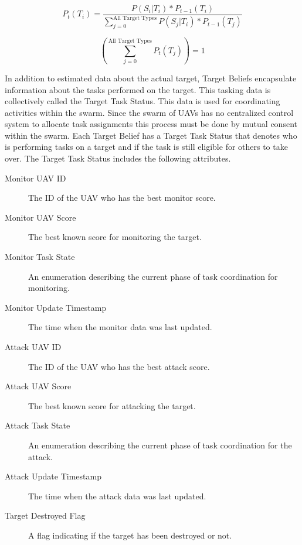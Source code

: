\begin{multicols*}{2}



\begin{equation}
\label{eq:bayesianTgt}
P_{t}(T_{i}) = \frac{P(S_{i}|T_{i})*P_{t-1}(T_{i})}{ \sum_{j=0}^{\text{All Target Types}}P(S_{j}|T_{i}) * P_{t-1}(T_{j}) }
\end{equation}

\begin{equation}
\label{eq:probsNormalize}
\left( \sum_{j=0}^{\text{All Target Types}}P_{t}(T_{j})\right)  = 1
\end{equation}



In addition to estimated data about the actual target, Target Beliefs encapsulate information about the tasks performed on the target.  This tasking data is collectively called the Target Task Status.  This data is used for coordinating activities within the swarm.  Since the swarm of UAVs has no centralized control system to allocate task assignments this process must be done by mutual consent within the swarm.  Each Target Belief has a Target Task Status that denotes who is performing tasks on a target and if the task is still eligible for others to take over.  The Target Task Status includes the following attributes.

\begin{description}
	\item [Monitor UAV ID] The ID of the UAV who has the best monitor score.
	\item [Monitor UAV Score] The best known score for monitoring the target.
	\item [Monitor Task State] An enumeration describing the current phase of task coordination for monitoring.
	\item [Monitor Update Timestamp] The time when the monitor data was last updated.
	\item [Attack UAV ID] The ID of the UAV who has the best attack score.
	\item [Attack UAV Score] The best known score for attacking the target.
	\item [Attack Task State] An enumeration describing the current phase of task coordination for the attack.
	\item [Attack Update Timestamp] The time when the attack data was last updated.
	\item [Target Destroyed Flag] A flag indicating if the target has been destroyed or not.
\end{description}


\end{multicols*}

